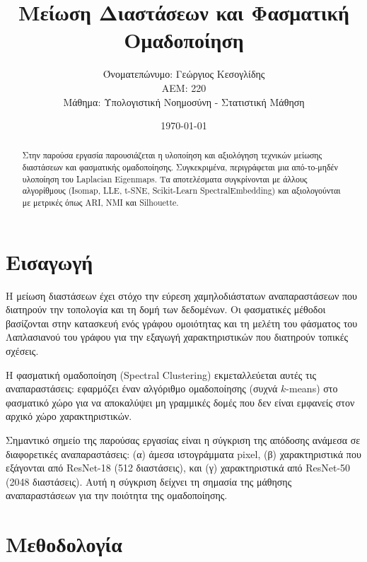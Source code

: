 \documentclass[a4paper,11pt]{article}
\title{Μείωση Διαστάσεων και Φασματική Ομαδοποίηση}
\author{Όνοματεπώνυμο: Γεώργιος Κεσογλίδης \\ ΑΕΜ: 220 \\ Μάθημα: Υπολογιστική Νοημοσύνη - Στατιστική Μάθηση}
\date{\today}
\newcommand{\lt}[1]{\foreignlanguage{english}{#1}}
\begin{document}
\maketitle

\begin{abstract}
Στην παρούσα εργασία παρουσιάζεται η υλοποίηση και αξιολόγηση τεχνικών μείωσης διαστάσεων και φασματικής ομαδοποίησης. Συγκεκριμένα, περιγράφεται μια από-το-μηδέν υλοποίηση του \lt{Laplacian Eigenmaps}. Τα αποτελέσματα συγκρίνονται με άλλους αλγορίθμους (\lt{Isomap}, \lt{LLE}, \lt{t-SNE}, \lt{Scikit-Learn SpectralEmbedding}) και αξιολογούνται με μετρικές όπως \lt{ARI}, \lt{NMI} και \lt{Silhouette}.
\end{abstract}

\tableofcontents
\newpage

\section{Εισαγωγή}
Η μείωση διαστάσεων έχει στόχο την εύρεση χαμηλοδιάστατων αναπαραστάσεων που διατηρούν την τοπολογία και τη δομή των δεδομένων. Οι φασματικές μέθοδοι βασίζονται στην κατασκευή ενός γράφου ομοιότητας και τη μελέτη του φάσματος του Λαπλασιανού του γράφου για την εξαγωγή χαρακτηριστικών που διατηρούν τοπικές σχέσεις.

Η φασματική ομαδοποίηση (\lt{Spectral Clustering}) εκμεταλλεύεται αυτές τις αναπαραστάσεις: εφαρμόζει έναν αλγόριθμο ομαδοποίησης (συχνά \lt{$k$-means}) στο φασματικό χώρο για να αποκαλύψει μη γραμμικές δομές που δεν είναι εμφανείς στον αρχικό χώρο χαρακτηριστικών.

Σημαντικό σημείο της παρούσας εργασίας είναι η σύγκριση της απόδοσης ανάμεσα σε διαφορετικές αναπαραστάσεις: (α) άμεσα ιστογράμματα pixel, (β) χαρακτηριστικά που εξάγονται από \lt{ResNet-18} (512 διαστάσεις), και (γ) χαρακτηριστικά από \lt{ResNet-50} (2048 διαστάσεις). Αυτή η σύγκριση δείχνει τη σημασία της μάθησης αναπαραστάσεων για την ποιότητα της ομαδοποίησης.

\section{Μεθοδολογία}
\end{document}

